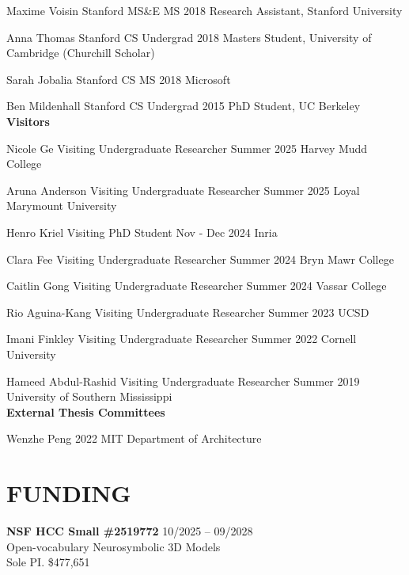 \documentclass[line,margin]{res}
\begin{document}
\begin{resume}
\alumni
{Maxime Voisin}
{Stanford MS\&E MS}
{2018}
{Research Assistant, Stanford University}

\alumni
{Anna Thomas}
{Stanford CS Undergrad}
{2018}
{Masters Student, University of Cambridge (Churchill Scholar)}

\alumni
{Sarah Jobalia}
{Stanford CS MS}
{2018}
{Microsoft}

\alumni
{Ben Mildenhall}
{Stanford CS Undergrad}
{2015}
{PhD Student, UC Berkeley}
\\


\textbf{Visitors}

\visitor
{Nicole Ge}
{Visiting Undergraduate Researcher}
{Summer 2025}
{Harvey Mudd College}

\visitor
{Aruna Anderson}
{Visiting Undergraduate Researcher}
{Summer 2025}
{Loyal Marymount University}

\visitor
{Henro Kriel}
{Visiting PhD Student}
{Nov - Dec 2024}
{Inria}

\visitor
{Clara Fee}
{Visiting Undergraduate Researcher}
{Summer 2024}
{Bryn Mawr College}

\visitor
{Caitlin Gong}
{Visiting Undergraduate Researcher}
{Summer 2024}
{Vassar College}

\visitor
{Rio Aguina-Kang}
{Visiting Undergraduate Researcher}
{Summer 2023}
{UCSD}

\visitor
{Imani Finkley}
{Visiting Undergraduate Researcher}
{Summer 2022}
{Cornell University}

\visitor
{Hameed Abdul-Rashid}
{Visiting Undergraduate Researcher}
{Summer 2019}
{University of Southern Mississippi}
\\


\textbf{External Thesis Committees}

\thesiscomm
{Wenzhe Peng}
{2022}
{MIT Department of Architecture}


\section{FUNDING}

\newcommand{\funding}[5] {
	\textbf{#1} \hfill #5\\
	#2 \\
	#3. #4
}

\funding
{NSF HCC Small \#2519772}
{Open-vocabulary Neurosymbolic 3D Models}
{Sole PI}
{\$477,651}
{10/2025 -- 09/2028}


\end{resume}
\end{document}
